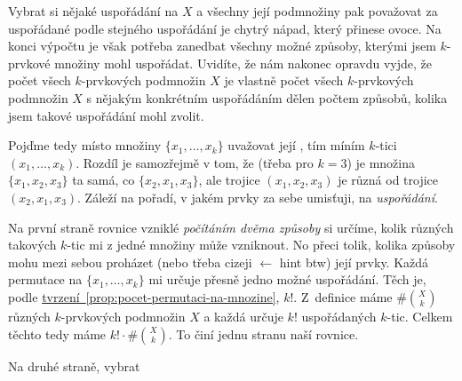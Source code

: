 Vybrat si nějaké uspořádání na $X$ a všechny její podmnožiny pak považovat za
uspořádané podle stejného uspořádání je chytrý nápad, který přinese ovoce. Na
konci výpočtu je však potřeba zanedbat všechny možné způsoby, kterými jsem
$k$-prvkové množiny mohl uspořádat. Uvidíte, že nám nakonec opravdu vyjde, že
počet všech $k$-prvkových podmnožin $X$ je vlastně počet všech $k$-prvkových
podmnožin $X$ s nějakým konkrétním uspořádáním dělen počtem způsobů, kolika jsem
takové uspořádání mohl zvolit.

Pojďme tedy místo množiny $\{x_1,\ldots,x_k\}$ uvažovat její , tím míním $k$-tici $(x_1,\ldots,x_k)$. Rozdíl je samozřejmě v tom, že
(třeba pro $k = 3$) je množina $\{x_1,x_2,x_3\}$ ta samá, co $\{x_2,x_1,x_3\}$,
ale trojice $(x_1,x_2,x_3)$ je různá od trojice $(x_2,x_1,x_3)$. Záleží na
pořadí, v jakém prvky za sebe umisťuji, na \emph{uspořádání}.

Na první straně rovnice vzniklé \emph{počítáním dvěma způsoby} si určíme, kolik
různých takových $k$-tic mi z jedné množiny může vzniknout. No přeci tolik,
kolika způsoby mohu mezi sebou proházet (nebo třeba cizeji 
$\leftarrow$ hint btw) její prvky. Každá permutace na $\{x_1,\ldots,x_k\}$ mi
určuje přesně jedno možné uspořádání. Těch je, podle
 \hyperref[prop:pocet-permutaci-na-mnozine]{tvrzení~\ref*{prop:pocet-permutaci-na-mnozine}},
 $k!$. Z~definice máme $\# \binom{X}{k}$ různých $k$-prvkových podmnožin $X$ a
 každá určuje $k!$ uspořádaných $k$-tic. Celkem těchto tedy máme $k! \cdot \#
 \binom{X}{k}$. To činí jednu stranu naší rovnice.

Na druhé straně, vybrat 
